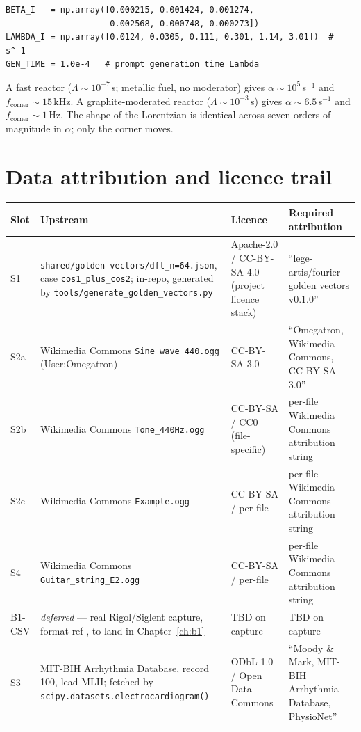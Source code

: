 \documentclass[11pt,a4paper,openany]{book}
\begin{document}
\begin{lstlisting}[style=shadpython]
BETA_I   = np.array([0.000215, 0.001424, 0.001274,
                     0.002568, 0.000748, 0.000273])
LAMBDA_I = np.array([0.0124, 0.0305, 0.111, 0.301, 1.14, 3.01])  # s^-1
GEN_TIME = 1.0e-4   # prompt generation time Lambda
\end{lstlisting}

A fast reactor ($\Lambda \sim 10^{-7}$\,s; metallic fuel, no moderator) gives
$\alpha \sim 10^5$\,s$^{-1}$ and $f_\mathrm{corner} \sim 15$\,kHz. A
graphite-moderated reactor ($\Lambda \sim 10^{-3}$\,s) gives
$\alpha \sim 6.5$\,s$^{-1}$ and $f_\mathrm{corner} \sim 1$\,Hz. The shape of
the Lorentzian is identical across seven orders of magnitude in $\alpha$; only
the corner moves.


\appendix

\chapter{Data attribution and licence trail}
\label{ch:dataattr}

\begin{longtable}{p{2.0cm}p{4.5cm}p{3.0cm}p{4.7cm}}
\toprule
\textbf{Slot} & \textbf{Upstream} & \textbf{Licence} & \textbf{Required attribution} \\
\midrule
\endhead
S1 & \texttt{shared/golden-vectors/dft\_n=64.json}, case \texttt{cos1\_plus\_cos2}; in-repo, generated by \texttt{tools/generate\_golden\_vectors.py} & Apache-2.0 / CC-BY-SA-4.0 (project licence stack) & ``lege-artis/fourier golden vectors v0.1.0'' \\
S2a & Wikimedia Commons \texttt{Sine\_wave\_440.ogg} (User:Omegatron) & CC-BY-SA-3.0 & ``Omegatron, Wikimedia Commons, CC-BY-SA-3.0'' \\
S2b & Wikimedia Commons \texttt{Tone\_440Hz.ogg} & CC-BY-SA / CC0 (file-specific) & per-file Wikimedia Commons attribution string \\
S2c & Wikimedia Commons \texttt{Example.ogg} & CC-BY-SA / per-file & per-file Wikimedia Commons attribution string \\
S4 & Wikimedia Commons \texttt{Guitar\_string\_E2.ogg} & CC-BY-SA / per-file & per-file Wikimedia Commons attribution string \\
B1-CSV & \emph{deferred} --- real Rigol/Siglent capture, format ref \cite{rg272996569}, to land in Chapter~\ref{ch:b1} & TBD on capture & TBD on capture \\
S3 & MIT-BIH Arrhythmia Database, record 100, lead MLII; fetched by \texttt{scipy.datasets.electrocardiogram()} \cite{Moody2001,Goldberger2000} & ODbL 1.0 / Open Data Commons & ``Moody \& Mark, MIT-BIH Arrhythmia Database, PhysioNet'' \\
\bottomrule
\end{longtable}
\end{document}
